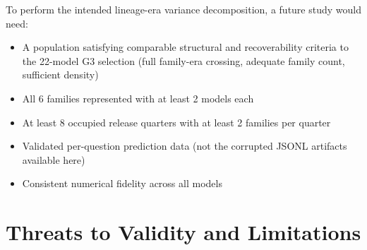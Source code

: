 \documentclass[journal]{IEEEtran}
\begin{document}
To perform the intended lineage-era variance decomposition, a future study would need:
\begin{itemize}
\item A population satisfying comparable structural and recoverability criteria to the 22-model G3 selection (full family-era crossing, adequate family count, sufficient density)
\item All 6 families represented with at least 2 models each
\item At least 8 occupied release quarters with at least 2 families per quarter
\item Validated per-question prediction data (not the corrupted JSONL artifacts available here)
\item Consistent numerical fidelity across all models
\end{itemize}

\section{Threats to Validity and Limitations}
\label{sec:threats}
\end{document}
